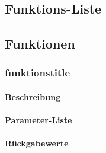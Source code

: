 \subsection*{Funktions-Liste}

\paragraph{}

\subsection*{Funktionen}

\subsubsection*{funktionstitle}\label{funktion}
\paragraph{Beschreibung}
\paragraph{Parameter-Liste}
\paragraph{Rückgabewerte}